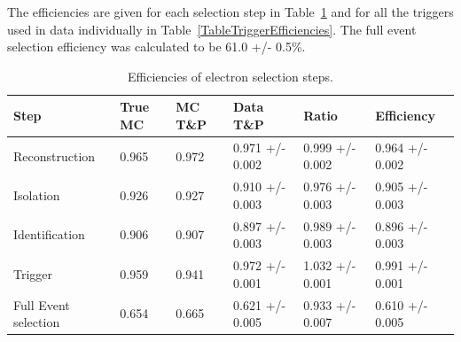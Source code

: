 The efficiencies are given for each selection step in Table~\ref{TableEfficiencies} %
and for all the triggers used in data individually in Table~\ref{TableTriggerEfficiencies}.  
The full event selection efficiency was calculated to be 
61.0 +/- 0.5\%.  

\begin{table}[htbp]
  \begin{center}
    \caption{Efficiencies of electron selection steps.}
    \label{TableEfficiencies}
    \begin{tabular}[]{ | l | l | l | l | l | l | }
      \hline
      Step & True MC & MC T\&P & Data T\&P & Ratio & Efficiency \\ \hline \hline
      Reconstruction & 0.965 & 0.972 & 0.971 +/- 0.002 & 0.999 +/- 0.002 & 0.964 +/- 0.002 \\ \hline
      Isolation & 0.926 & 0.927 & 0.910 +/- 0.003 & 0.976 +/- 0.003 & 0.905 +/- 0.003 \\ \hline
      Identification & 0.906 & 0.907 & 0.897 +/- 0.003 & 0.989 +/- 0.003 & 0.896 +/- 0.003 \\ \hline
      Trigger & 0.959 & 0.941 & 0.972 +/- 0.001 & 1.032 +/- 0.001 & 0.991 +/- 0.001 \\ \hline
      Full Event selection & 0.654 & 0.665 & 0.621 +/- 0.005 & 0.933 +/- 0.007 & 0.610 +/- 0.005 \\ \hline
    \end{tabular}
  \end{center}
\end{table}






